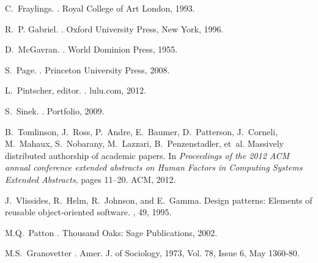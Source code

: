 \documentclass{acm_proc_article-sp}
\begin{document}
\begin{thebibliography}{10}
C.~Fraylings.
.
\newblock Royal College of Art London, 1993.

R.~P. Gabriel.
.
\newblock Oxford University Press, New York, 1996.

D.~McGavran.
.
\newblock World Dominion Press, 1955.

S.~Page.
.
\newblock Princeton University Press, 2008.

L.~Pintscher, editor.
.
\newblock lulu.com, 2012.

S.~Sinek.
.
\newblock Portfolio, 2009.

B.~Tomlinson, J.~Ross, P.~Andre, E.~Baumer, D.~Patterson, J.~Corneli,
  M.~Mahaux, S.~Nobarany, M.~Lazzari, B.~Penzenstadler, et~al.
\newblock Massively distributed authorship of academic papers.
\newblock In {\em Proceedings of the 2012 ACM annual conference extended
  abstracts on Human Factors in Computing Systems Extended Abstracts}, pages
  11--20. ACM, 2012.

J.~Vlissides, R.~Helm, R.~Johnson, and E.~Gamma.
\newblock Design patterns: Elements of reusable object-oriented software.
, 49, 1995.

M.Q.~Patton
.
\newblock Thousand Oaks: Sage Publications, 2002.

M.S.~Granovetter
.
\newblock Amer. J. of Sociology, 1973, Vol. 78, Issue 6, May 1360-80.

\end{thebibliography}
\end{document}
